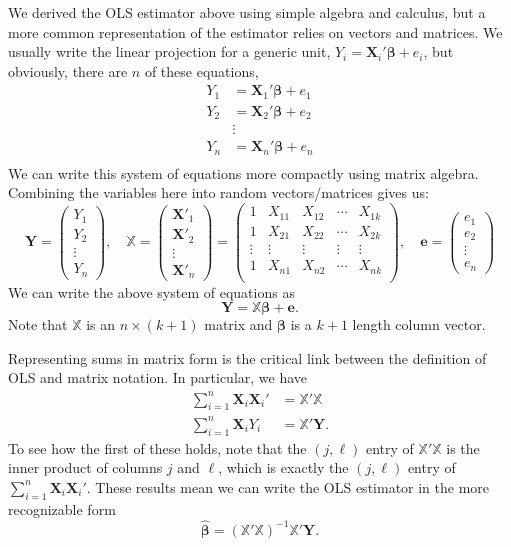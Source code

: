 \documentclass[
  13pt,
  letterpaper,
  DIV=11,
  numbers=noendperiod]{scrreprt}
\newcommand{\mb}{\bm}
\newcommand{\X}{\mb{X}}
\newcommand{\Xmat}{\mathbb{X}}
\newcommand{\bfbeta}{\mb{\beta}}
\newcommand{\bhat}{\widehat{\mb{\beta}}}
\theoremstyle{plain}
\theoremstyle{plain}
\theoremstyle{definition}
\theoremstyle{definition}
\theoremstyle{remark}
\begin{document}
We derived the OLS estimator above using simple algebra and calculus,
but a more common representation of the estimator relies on vectors and
matrices. We usually write the linear projection for a generic unit,
\(Y_i = \X_i'\bfbeta + e_i\), but obviously, there are \(n\) of these
equations, \[ 
\begin{aligned}
  Y_1 &= \X_1'\bfbeta + e_1 \\
  Y_2 &= \X_2'\bfbeta + e_2 \\
  &\vdots \\
  Y_n &= \X_n'\bfbeta + e_n \\
\end{aligned}
\] We can write this system of equations more compactly using matrix
algebra. Combining the variables here into random vectors/matrices gives
us: \[
\mb{Y} = \begin{pmatrix}
Y_1 \\ Y_2 \\ \vdots \\ Y_n
  \end{pmatrix}, \quad
  \mathbb{X} = \begin{pmatrix}
\X'_1 \\
\X'_2 \\
\vdots \\
\X'_n
  \end{pmatrix} =
  \begin{pmatrix}
    1 & X_{11} & X_{12} & \cdots & X_{1k} \\
    1 & X_{21} & X_{22} & \cdots & X_{2k} \\
    \vdots & \vdots & \vdots & \vdots & \vdots \\
    1 & X_{n1} & X_{n2} & \cdots & X_{nk} \\
  \end{pmatrix},
  \quad
  \mb{e} = \begin{pmatrix}
e_1 \\ e_2 \\ \vdots \\ e_n
  \end{pmatrix}
\] We can write the above system of equations as \[
\mb{Y} = \mathbb{X}\bfbeta + \mb{e}. 
\] Note that \(\mathbb{X}\) is an \(n \times (k+1)\) matrix and
\(\bfbeta\) is a \(k+1\) length column vector.

Representing sums in matrix form is the critical link between the
definition of OLS and matrix notation. In particular, we have \[
\begin{aligned}
  \sum_{i=1}^n \X_i\X_i' &= \Xmat'\Xmat \\
  \sum_{i=1}^n \X_iY_i &= \Xmat'\mb{Y}.
\end{aligned}
\] To see how the first of these holds, note that the \((j, \ell)\)
entry of \(\Xmat'\Xmat\) is the inner product of columns \(j\) and
\(\ell\), which is exactly the \((j, \ell)\) entry of
\(\sum_{i=1}^n \X_i\X_i'\). These results mean we can write the OLS
estimator in the more recognizable form \[ 
\bhat = \left( \mathbb{X}'\mathbb{X} \right)^{-1} \mathbb{X}'\mb{Y}.
\]
\end{document}
